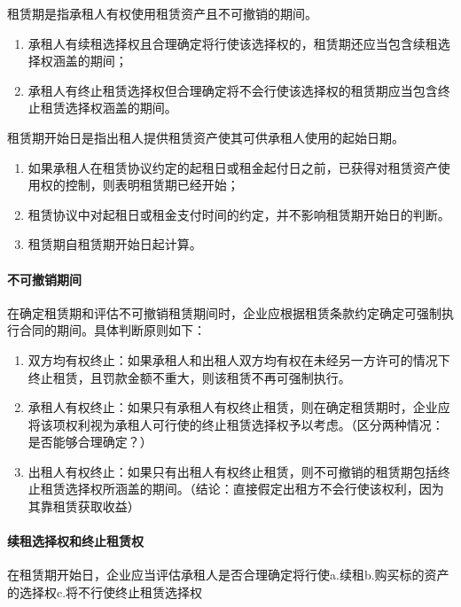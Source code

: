 \documentclass[UTF8,12pt]{ctexart}
\numberwithin{equation}{section} %
\numberwithin{figure}{section}
\numberwithin{table}{section}
\begin{document}
	租赁期是指承租人有权使用租赁资产且不可撤销的期间。
	\begin{enumerate}
		\item 承租人有续租选择权且合理确定将行使该选择权的，租赁期还应当包含续租选择权涵盖的期间；
		
		\item 承租人有终止租赁选择权但合理确定将不会行使该选择权的租赁期应当包含终止租赁选择权涵盖的期间。
	\end{enumerate}

	租赁期开始日是指出租人提供租赁资产使其可供承租人使用的起始日期。
	\begin{enumerate}
		\item 如果承租人在租赁协议约定的起租日或租金起付日之前，已获得对租赁资产使用权的控制，则表明租赁期已经开始；
		
		\item 租赁协议中对起租日或租金支付时间的约定，并不影响租赁期开始日的判断。
		
		\item 租赁期自租赁期开始日起计算。
	\end{enumerate}

	\paragraph{不可撤销期间}
	在确定租赁期和评估不可撤销租赁期间时，企业应根据租赁条款约定确定可强制执行合同的期间。具体判断原则如下：
	\begin{enumerate}
		\item 双方均有权终止：如果承租人和出租人双方均有权在未经另一方许可的情况下终止租赁，且罚款金额不重大，则该租赁不再可强制执行。
		
		\item 承租人有权终止：如果只有承租人有权终止租赁，则在确定租赁期时，企业应将该项权利视为承租人可行使的终止租赁选择权予以考虑。（区分两种情况：是否能够合理确定？）
		
		\item 出租人有权终止：如果只有出租人有权终止租赁，则不可撤销的租赁期包括终止租赁选择权所涵盖的期间。（结论：直接假定出租方不会行使该权利，因为其靠租赁获取收益）
	\end{enumerate}
	
	\paragraph{续租选择权和终止租赁权}
	在租赁期开始日，企业应当评估承租人是否合理确定将行使a.续租b.购买标的资产的选择权c.将不行使终止租赁选择权
	
\end{document}
